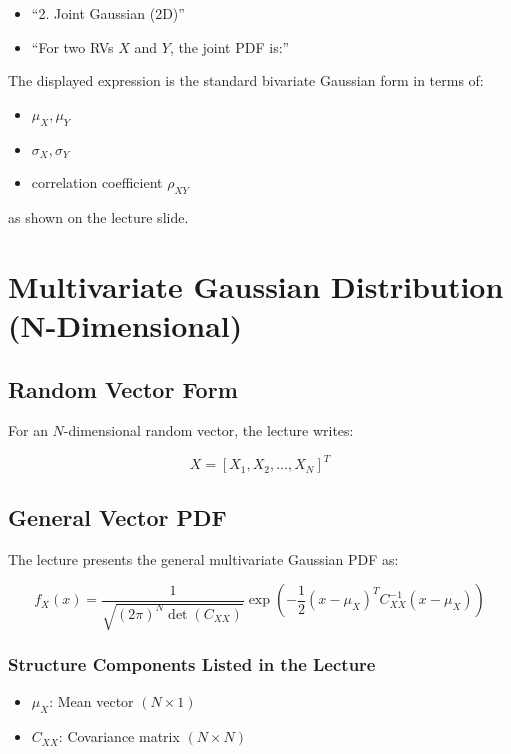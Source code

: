 \documentclass[12pt]{article}
\begin{document}
\begin{itemize}
    \item ``2. Joint Gaussian (2D)''
    \item ``For two RVs \(X\) and \(Y\), the joint PDF is:''
\end{itemize}

The displayed expression is the standard bivariate Gaussian form in terms of:

\begin{itemize}
    \item \(\mu_X, \mu_Y\)
    \item \(\sigma_X, \sigma_Y\)
    \item correlation coefficient \(\rho_{XY}\)
\end{itemize}

as shown on the lecture slide.

\section{Multivariate Gaussian Distribution (N-Dimensional)}

\subsection{Random Vector Form}

For an \(N\)-dimensional random vector, the lecture writes:

\[
X = [X_1, X_2, \ldots, X_N]^T
\]

\subsection{General Vector PDF}

The lecture presents the general multivariate Gaussian PDF as:

\[
f_X(x) =
\frac{1}{\sqrt{(2\pi)^N \det(C_{XX})}}
\exp\left(
-\frac{1}{2}(x-\mu_X)^T C_{XX}^{-1}(x-\mu_X)
\right)
\]

\subsubsection*{Structure Components Listed in the Lecture}

\begin{itemize}
    \item \(\mu_X\): Mean vector \((N \times 1)\)
    \item \(C_{XX}\): Covariance matrix \((N \times N)\)
\end{itemize}
\end{document}
